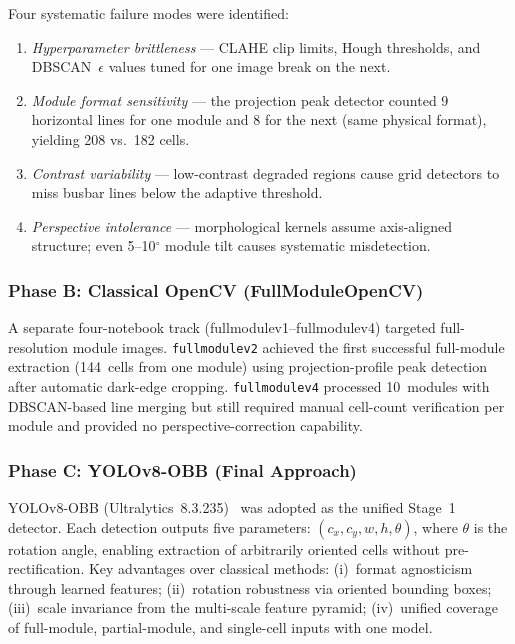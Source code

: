 \documentclass[conference]{IEEEtran}
\begin{document}
Four systematic failure modes were identified:
\begin{enumerate}
  \item \textit{Hyperparameter brittleness} --- CLAHE clip
        limits, Hough thresholds, and DBSCAN~$\epsilon$ values
        tuned for one image break on the next.
  \item \textit{Module format sensitivity} --- the projection
        peak detector counted 9 horizontal lines for one module
        and 8 for the next (same physical format), yielding
        208 vs.\ 182 cells.
  \item \textit{Contrast variability} --- low-contrast
        degraded regions cause grid detectors to miss busbar
        lines below the adaptive threshold.
  \item \textit{Perspective intolerance} --- morphological
        kernels assume axis-aligned structure; even
        5--10$^\circ$ module tilt causes systematic
        misdetection.
\end{enumerate}

\subsubsection{Phase B: Classical OpenCV (FullModuleOpenCV)}

A separate four-notebook track (fullmodulev1--fullmodulev4)
targeted full-resolution module images.
\texttt{fullmodulev2} achieved the first successful full-module
extraction (144~cells from one module) using projection-profile
peak detection after automatic dark-edge cropping.
\texttt{fullmodulev4} processed 10~modules with DBSCAN-based
line merging but still required manual cell-count verification
per module and provided no perspective-correction capability.

\subsubsection{Phase C: YOLOv8-OBB (Final Approach)}

YOLOv8-OBB (Ultralytics~8.3.235)~\cite{jocher2023} was
adopted as the unified Stage~1 detector.
Each detection outputs five parameters:
$(c_x, c_y, w, h, \theta)$, where $\theta$ is the rotation
angle, enabling extraction of arbitrarily oriented cells
without pre-rectification.
Key advantages over classical methods: (i)~format agnosticism
through learned features; (ii)~rotation robustness via
oriented bounding boxes; (iii)~scale invariance from the
multi-scale feature pyramid; (iv)~unified coverage of
full-module, partial-module, and single-cell inputs with one
model.
\end{document}
